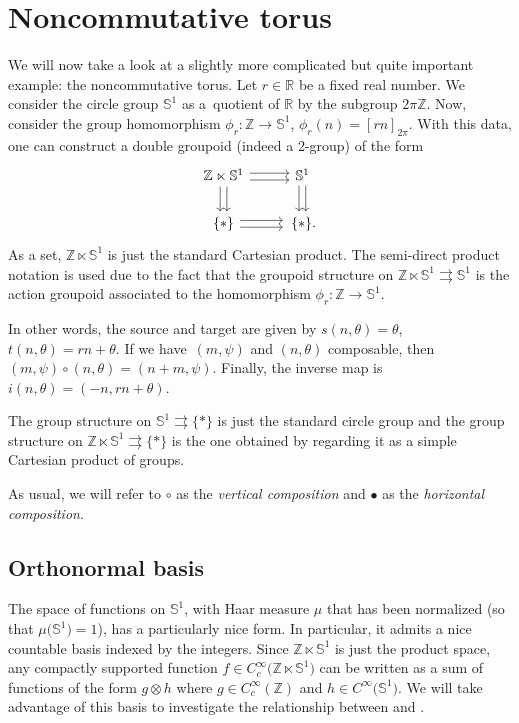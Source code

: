 \documentclass[10pt,a4paper]{amsart}
\numberwithin{equation}{section}
\theoremstyle{definition}
\newcommand{\BBR}{\mathbb{R}}
\newcommand{\BBZ}{\mathbb{Z}}
\newcommand{\BBS}{\mathbb{S}}
\newcommand{\stardot}{\overset{{\bullet}}{*}}
\newcommand{\starcirc}{\overset{\circ}{*}}
\newcommand{\darrow}{\arrow[d, shift right] \arrow[d, shift left]}
\newcommand{\rarrow}{\arrow[r, shift right] \arrow[r, shift left]}
\newcommand{\grpd}{\rightrightarrows}
\begin{document}
\section{Noncommutative torus}\label{Section:noncommutative.torus}
We will now take a look at a slightly more complicated but quite important example: the noncom\-mutative torus. Let $ r \in \BBR $ be a fixed real number.
We consider the circle group $ \BBS^1 $ as a~quotient of $ \BBR $ by the subgroup $ 2 \pi \BBZ $. Now, consider the group homomorphism
$\phi_r \colon \BBZ \to \BBS^1$, $\phi_r(n) = [rn]_{2 \pi}$.
With this data, one can construct a double groupoid (indeed a 2-group) of the form
 \[\begin{tikzcd}
\BBZ \ltimes \BBS^1 \darrow \rarrow & \BBS^1 \darrow \\
\{ * \} \rarrow &\, \{ * \}.
\end{tikzcd}
\]
As a set, $ \BBZ \ltimes \BBS^1 $ is just the standard Cartesian product.
The semi-direct product notation is used due to the fact that the groupoid structure on $ \BBZ \ltimes \BBS^1 \grpd \BBS^1 $ is the action groupoid associated to the homomorphism $ \phi_r \colon \BBZ \to \BBS^1 $.

In other words, the source and target are given by
$s(n,\theta) = \theta$, $ t(n,\theta) = rn + \theta$.
If we have~$ (m,\psi) $ and $ (n,\theta)$ composable, then
$(m,\psi) \circ (n, \theta) = (n + m, \psi)$.
Finally, the inverse map is
$i(n,\theta) = (-n, rn + \theta) $.

The group structure on $ \BBS^1 \grpd \{ * \} $ is just the standard circle group and the group structure on $ \BBZ \ltimes \BBS^1 \grpd \{ * \} $ is the one obtained by regarding it as a simple Cartesian product of groups.

As usual, we will refer to $ \circ $ as the \emph{vertical composition} and $ \bullet $ as the \emph{horizontal composition}.

\subsection{Orthonormal basis}
The space of functions on $ \BBS^1 $, with Haar measure $\mu$ that has been normalized \big(so that $\mu\big(\BBS^1\big)=1$\big), has a particularly nice form. In particular, it admits a nice countable basis indexed by the integers. Since $ \BBZ \ltimes \BBS^1 $ is just the product space, any compactly supported function ${f\in C_c^\infty\big(\BBZ \ltimes \BBS^1 \big)}$ can be written as a sum of functions of the form $g \otimes h$ where $g\in C_c^\infty(\BBZ)$ and $h\in C^\infty\big(\BBS^1\big)$. We will take advantage of this basis to investigate the relationship between \smash{$ \stardot $} and \smash{$ \starcirc $}.
\end{document}
